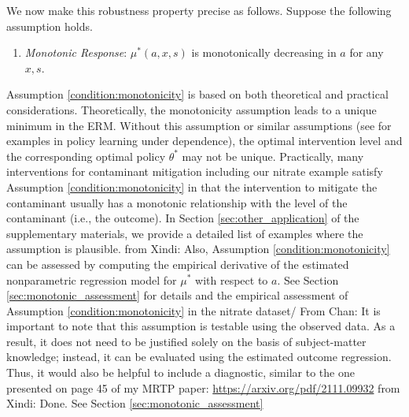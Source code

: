 \documentclass[12pt]{article}
\newcommand{\CP}[1]{{\color{purple}From Chan: #1}}
\newcommand{\XL}[1]{{\color{blue}from Xindi: #1}}
\begin{document}
We now make this robustness property precise as follows. Suppose the following assumption holds.
\begin{enumerate}[label=(B\arabic*),start=1]
     \item \emph{Monotonic Response}: $\mu^*(a,x,s)$ is monotonically decreasing in $a$ for any $x,s$. \label{condition:monotonicity}
\end{enumerate}
Assumption \ref{condition:monotonicity} is based on both theoretical and practical considerations. Theoretically, the monotonicity assumption leads to a unique minimum in the ERM. Without this assumption or similar assumptions (see \citet{ pouget2019testing,aronow2021spillover,yuan2023two,park2024minimum} for examples in policy learning under dependence), the optimal intervention level and the corresponding optimal policy $\theta^*$ may not be unique.  %
Practically, many interventions for contaminant mitigation including our nitrate example satisfy Assumption \ref{condition:monotonicity} in that the intervention to mitigate the contaminant usually has a monotonic relationship with the level of the contaminant (i.e., the outcome). In Section \ref{sec:other_application} of the supplementary materials, we provide a detailed list of examples where the assumption is plausible. \XL{Also, Assumption \ref{condition:monotonicity} can be assessed by computing the empirical derivative of the estimated nonparametric regression model for $\mu^*$ with respect to $a$. See Section \ref{sec:monotonic_assessment} for details and the empirical assessment of Assumption \ref{condition:monotonicity} in the nitrate dataset/}
\CP{It is important to note that this assumption is testable using the observed data. As a result, it does not need to be justified solely on the basis of subject-matter knowledge; instead, it can be evaluated using the estimated outcome regression. Thus, it would also be helpful to include a diagnostic, similar to the one presented on page 45 of my MRTP paper: \url{https://arxiv.org/pdf/2111.09932}} \XL{Done. See Section \ref{sec:monotonic_assessment}}
\end{document}
